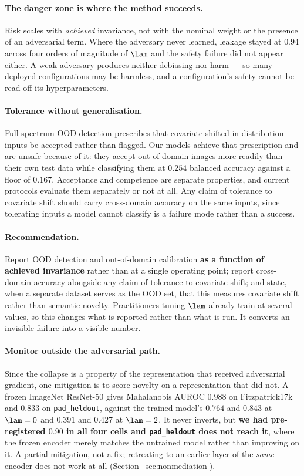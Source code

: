 \paragraph{The danger zone is where the method succeeds.}
Risk scales with \emph{achieved} invariance, not with the nominal weight or the
presence of an adversarial term. Where the adversary never learned, leakage stayed at
$0.94$ across four orders of magnitude of $\lam$ and the safety failure did not appear
either. A weak adversary produces neither debiasing nor harm --- so many deployed
configurations may be harmless, and a configuration's safety cannot be read off its
hyperparameters.

\paragraph{Tolerance without generalisation.}\label{sec:tolerance}
Full-spectrum OOD detection \cite{yang2023} prescribes that covariate-shifted
in-distribution inputs be accepted rather than flagged. Our models achieve that
prescription and are unsafe because of it: they accept out-of-domain images more
readily than their own test data while classifying them at $0.254$ balanced accuracy
against a floor of $0.167$. Acceptance and competence are separate properties, and
current protocols evaluate them separately or not at all. Any claim of tolerance to
covariate shift should carry cross-domain accuracy on the same inputs, since tolerating
inputs a model cannot classify is a failure mode rather than a success.

\paragraph{Recommendation.}
Report OOD detection and out-of-domain calibration \textbf{as a function of achieved
invariance} rather than at a single operating point; report cross-domain accuracy
alongside any claim of tolerance to covariate shift; and state, when a separate
dataset serves as the OOD set, that this measures covariate shift rather than
semantic novelty. Practitioners tuning $\lam$ already train at several values, so
this changes what is reported rather than what is run. It converts an invisible
failure into a visible number.

\paragraph{Monitor outside the adversarial path.}
Since the collapse is a property of the representation that received adversarial
gradient, one mitigation is to score novelty on a representation that did not. A
frozen ImageNet ResNet-50 gives Mahalanobis AUROC $0.988$ on Fitzpatrick17k and
$0.833$ on \texttt{pad\_heldout}, against the trained model's $0.764$ and $0.843$ at
$\lam = 0$ and $0.391$ and $0.427$ at $\lam = 2$. It never inverts, but \textbf{we
had pre-registered $0.90$ in all four cells and \texttt{pad\_heldout} does not reach
it}, where the frozen encoder merely matches the untrained model rather than
improving on it. A partial mitigation, not a fix; retreating to an earlier layer of
the \emph{same} encoder does not work at all (Section~\ref{sec:nonmediation}).

